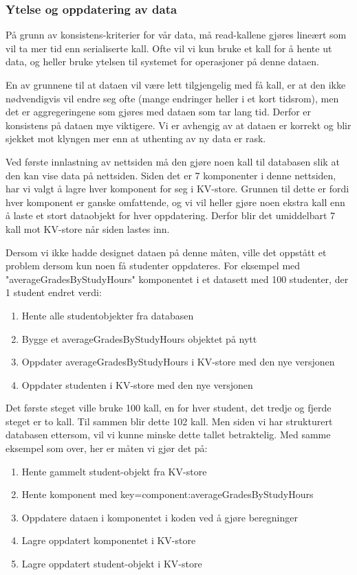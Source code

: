 \subsubsection{Ytelse og oppdatering av data}
På grunn av konsistens-kriterier for vår data, må read-kallene gjøres lineært som vil ta mer tid enn serialiserte kall. Ofte vil vi kun bruke et kall for å hente ut data, og heller bruke ytelsen til systemet for operasjoner på denne dataen.

En av grunnene til at dataen vil være lett tilgjengelig med få kall, er at den ikke nødvendigvis vil endre seg ofte (mange endringer heller i et kort tidsrom), men det er aggregeringene som gjøres med dataen som tar lang tid. Derfor er konsistens på dataen mye viktigere. Vi er avhengig av at dataen er korrekt og blir sjekket mot klyngen mer enn at uthenting av ny data er rask.

Ved første innlastning av nettsiden må den gjøre noen kall til databasen slik at den kan vise data på nettsiden. Siden det er 7 komponenter i denne nettsiden, har vi valgt å lagre hver komponent for seg i KV-store. Grunnen til dette er fordi hver komponent er ganske omfattende, og vi vil heller gjøre noen ekstra kall enn å laste et stort dataobjekt for hver oppdatering. Derfor blir det umiddelbart 7 kall mot KV-store når siden lastes inn.

Dersom vi ikke hadde designet dataen på denne måten, ville det oppstått  et problem dersom kun noen få studenter oppdateres. For eksempel med "averageGradesByStudyHours" komponentet i et datasett med 100 studenter, der 1 student endret verdi:

\begin{enumerate}
  \item Hente alle studentobjekter fra databasen
  \item Bygge et averageGradesByStudyHours objektet på nytt
  \item Oppdater averageGradesByStudyHours i KV-store med den nye versjonen
  \item Oppdater studenten i KV-store med den nye versjonen
\end{enumerate}

Det første steget ville bruke 100 kall, en for hver student, det tredje og fjerde steget er to kall. Til sammen blir dette 102 kall. Men siden vi har strukturert databasen ettersom, vil vi kunne minske dette tallet betraktelig. Med samme eksempel som over, her er måten vi gjør det på:

\begin{enumerate}
  \item Hente gammelt student-objekt fra KV-store
  \item Hente komponent med key=component:averageGradesByStudyHours
  \item Oppdatere dataen i komponentet i koden ved å gjøre beregninger
  \item Lagre oppdatert komponentet i KV-store
  \item Lagre oppdatert student-objekt i KV-store
\end{enumerate}

